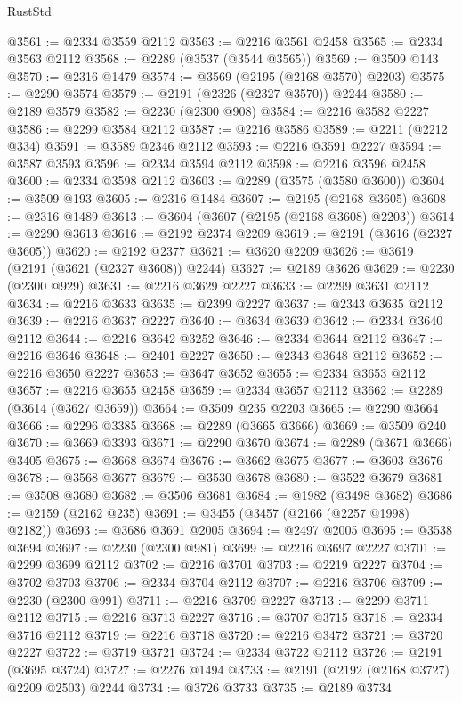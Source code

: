 \begin{lexlean}{RustStd}
\begin{coremodule}
@3561 := @2334 @3559 @2112
@3563 := @2216 @3561 @2458
@3565 := @2334 @3563 @2112
@3568 := @2289 (@3537 (@3544 @3565))
@3569 := @3509 @143
@3570 := @2316 @1479
@3574 := @3569 (@2195 (@2168 @3570) @2203)
@3575 := @2290 @3574
@3579 := @2191 (@2326 (@2327 @3570)) @2244
@3580 := @2189 @3579
@3582 := @2230 (@2300 @908)
@3584 := @2216 @3582 @2227
@3586 := @2299 @3584 @2112
@3587 := @2216 @3586
@3589 := @2211 (@2212 @334)
@3591 := @3589 @2346 @2112
@3593 := @2216 @3591 @2227
@3594 := @3587 @3593
@3596 := @2334 @3594 @2112
@3598 := @2216 @3596 @2458
@3600 := @2334 @3598 @2112
@3603 := @2289 (@3575 (@3580 @3600))
@3604 := @3509 @193
@3605 := @2316 @1484
@3607 := @2195 (@2168 @3605)
@3608 := @2316 @1489
@3613 := @3604 (@3607 (@2195 (@2168 @3608) @2203))
@3614 := @2290 @3613
@3616 := @2192 @2374 @2209
@3619 := @2191 (@3616 (@2327 @3605))
@3620 := @2192 @2377
@3621 := @3620 @2209
@3626 := @3619 (@2191 (@3621 (@2327 @3608)) @2244)
@3627 := @2189 @3626
@3629 := @2230 (@2300 @929)
@3631 := @2216 @3629 @2227
@3633 := @2299 @3631 @2112
@3634 := @2216 @3633
@3635 := @2399 @2227
@3637 := @2343 @3635 @2112
@3639 := @2216 @3637 @2227
@3640 := @3634 @3639
@3642 := @2334 @3640 @2112
@3644 := @2216 @3642 @3252
@3646 := @2334 @3644 @2112
@3647 := @2216 @3646
@3648 := @2401 @2227
@3650 := @2343 @3648 @2112
@3652 := @2216 @3650 @2227
@3653 := @3647 @3652
@3655 := @2334 @3653 @2112
@3657 := @2216 @3655 @2458
@3659 := @2334 @3657 @2112
@3662 := @2289 (@3614 (@3627 @3659))
@3664 := @3509 @235 @2203
@3665 := @2290 @3664
@3666 := @2296 @3385
@3668 := @2289 (@3665 @3666)
@3669 := @3509 @240
@3670 := @3669 @3393
@3671 := @2290 @3670
@3674 := @2289 (@3671 @3666) @3405
@3675 := @3668 @3674
@3676 := @3662 @3675
@3677 := @3603 @3676
@3678 := @3568 @3677
@3679 := @3530 @3678
@3680 := @3522 @3679
@3681 := @3508 @3680
@3682 := @3506 @3681
@3684 := @1982 (@3498 @3682)
@3686 := @2159 (@2162 @235)
@3691 := @3455 (@3457 (@2166 (@2257 @1998) @2182))
@3693 := @3686 @3691 @2005
@3694 := @2497 @2005
@3695 := @3538 @3694
@3697 := @2230 (@2300 @981)
@3699 := @2216 @3697 @2227
@3701 := @2299 @3699 @2112
@3702 := @2216 @3701
@3703 := @2219 @2227
@3704 := @3702 @3703
@3706 := @2334 @3704 @2112
@3707 := @2216 @3706
@3709 := @2230 (@2300 @991)
@3711 := @2216 @3709 @2227
@3713 := @2299 @3711 @2112
@3715 := @2216 @3713 @2227
@3716 := @3707 @3715
@3718 := @2334 @3716 @2112
@3719 := @2216 @3718
@3720 := @2216 @3472
@3721 := @3720 @2227
@3722 := @3719 @3721
@3724 := @2334 @3722 @2112
@3726 := @2191 (@3695 @3724)
@3727 := @2276 @1494
@3733 := @2191 (@2192 (@2168 @3727) @2209 @2503) @2244
@3734 := @3726 @3733
@3735 := @2189 @3734

\end{coremodule}
\end{lexlean}
